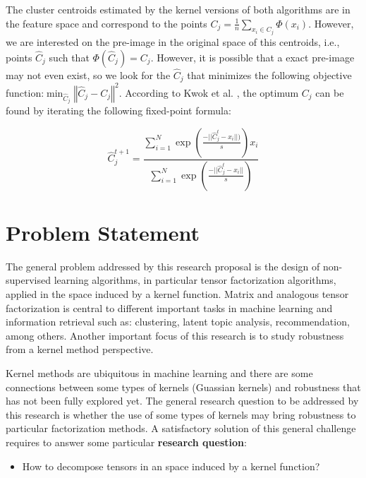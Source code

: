 \documentclass[letterpaper,12pt]{article}
\begin{document}
The cluster centroids estimated by the kernel versions of both algorithms are in the feature space and correspond to the points $C_{j}=\frac{1}{n}\sum_{x_{i}\in C_{j}}\Phi(x_{i})$. However, we are interested on the pre-image in the original space of this centroids, i.e., points $\hat{C}_{j}$ such that $\Phi(\hat{C}_{j})=C_{j}$. However, it is possible that a exact pre-image may not even exist, so we look for the $\hat{C}_{j}$ that minimizes the following objective function:$\min_{\hat{C}_{j}}\left\Vert \hat{C}_{j}-C_{j}\right\Vert ^{2}$. According to Kwok et al. \cite{kwok2004preimage}, the optimum $C_{j}$ can be found by iterating the following fixed-point formula:

\begin{equation}
\hat{C}_{j}^{t+1}=\frac{\sum_{i=1}^{N}\exp(\frac{-||\hat{C}_{j}^{t}-x_{i}||)}{s})x_{i}}{\sum_{i=1}^{N}\exp(\frac{-||\hat{C}_{j}^{t}-x_{i}||}{s})}\label{eq:back-projection}
\end{equation}



\section{Problem Statement}

The general problem addressed by this research proposal is the design of non-supervised learning algorithms, in particular tensor factorization algorithms, applied in the space induced by a kernel function. Matrix and analogous tensor factorization is central to different important tasks in machine learning and information retrieval such as: clustering, latent topic analysis, recommendation, among others. Another important focus of this research is to study robustness from a kernel method perspective. 

Kernel methods are ubiquitous in machine learning and there are some connections between some types of kernels (Guassian kernels) and robustness that has not been fully explored yet. The general research question to be addressed by this research is whether the use of some types of kernels may bring robustness to particular factorization methods. A satisfactory solution of this general challenge requires to answer some particular \textbf{research question}: 

\begin{itemize}
 \item How to decompose tensors in an space induced by a kernel function? %
\end{itemize}
\end{document}
